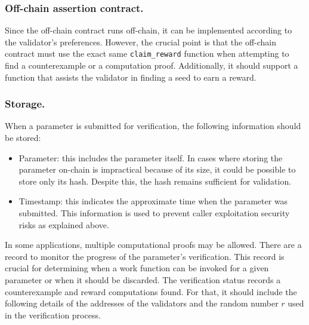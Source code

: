 \documentclass[runningheads]{llncs}
\begin{document}
\subsubsection{Off-chain assertion contract.}
Since the off-chain contract runs off-chain, it can be implemented according to the validator's preferences. However, the crucial point is that the off-chain contract must use the exact same \lstinline|claim_reward| function when attempting to find a counterexample or a computation proof. Additionally, it should support a function that assists the validator in finding a seed to earn a reward.
\subsubsection{Storage.}
When a parameter is submitted for verification, the following information should be stored:
\begin{itemize}
\item Parameter: this includes the parameter itself. In cases where storing the parameter on-chain is impractical because of its size, it could be possible to store only its hash. Despite this, the hash remains sufficient for validation.
\item Timestamp: this indicates the approximate time when the parameter was submitted. This information is used to prevent caller exploitation security risks as explained above.
\end{itemize}

In some applications, multiple computational proofs may be allowed. There are a record to monitor the progress of the parameter's verification. This record is crucial for determining when a work function can be invoked for a given parameter or when it should be discarded. The verification status records a counterexample and reward computations found. For that, it should include the following details of the addresses of the validators and the random number $r$ used in the verification process.
\end{document}
